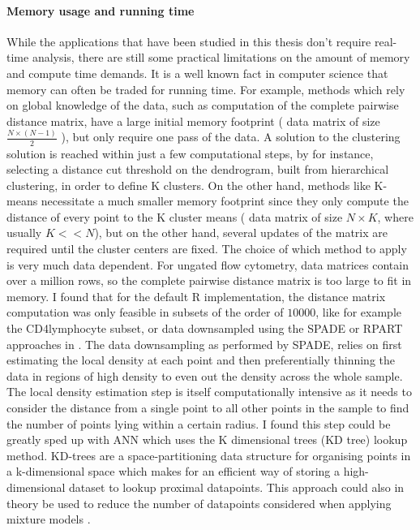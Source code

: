 \paragraph{Memory usage and running time}
While the applications that have been studied in this thesis don’t require real-time analysis, there are still some practical limitations on the amount of memory and compute time demands.
It is a well known fact in computer science that memory can often be traded for running time.
For example, methods which rely on global knowledge of the data, such as computation of the complete pairwise distance matrix,
have a large initial memory footprint ( data matrix of size $\frac{N \times (N-1)}{2}$ ), but only require one pass of the data.
A solution to the clustering solution is reached within just a few computational steps, by for instance,
selecting a distance cut threshold on the dendrogram, built from hierarchical clustering, in order to define K clusters. 
On the other hand, methods like K-means necessitate a much smaller memory footprint since they only compute the distance of every point to the K cluster means ( data matrix of size $N \times K$, where usually $K << N$), but on the other hand, several updates of the matrix are required until the cluster centers are fixed.
The choice of which method to apply is very much data dependent.
For ungated flow cytometry, data matrices  contain over a million rows, so the complete pairwise distance matrix is too large to fit in memory.
I found that for the default R implementation, the distance matrix computation was only feasible in subsets of the order of $10000$, like for example the CD4\positive lymphocyte subset, or data downsampled using the SPADE or RPART approaches in .
The data downsampling as performed by SPADE, relies on first estimating the local density at each point and then preferentially thinning the data in regions of high density to even out the density across the whole sample.
The local density estimation step is itself computationally intensive as it needs to consider the distance from a single point to all other points in the sample to find the number of points lying within a certain radius.
I found this step could be greatly sped up with \gls{ANN} which uses the K dimensional trees (KD tree) lookup method.
KD-trees are a space-partitioning data structure for organising points in a k-dimensional space which makes for an efficient
way of storing a high-dimensional dataset to lookup proximal datapoints.
This approach could also in theory be used to reduce the number of datapoints considered when applying mixture models \citep{McLachlan:2004uw}.


